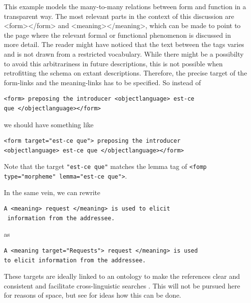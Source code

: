 \documentclass[a4paper,12pt]{article}
\begin{document}
This example models the many-to-many relations between form and function in a transparent way. The most relevant parts in the context of this discussion are <form></form> and <meaning></meaning>, which can be made to point to the page where the relevant formal or functional phenomenon is discussed in more detail. The reader might have noticed that the text between the tags varies and is not drawn from a restricted vocabulary. While there might be a possibilty to avoid this arbitrariness in future descriptions, this is not possible when retrofitting the schema on extant descriptions. Therefore, the precise target of the form-links and the meaning-links has to be specified. So instead of

\ea \begin{verbatim}<form> preposing the introducer <objectlanguage> est-ce
que </objectlanguage></form>\end{verbatim} \z

we should have something like

\ea \begin{verbatim}<form target="est-ce que"> preposing the introducer
<objectlanguage> est-ce que </objectlanguage></form>\end{verbatim} \z

Note that the target {\tt "est-ce que"} matches the lemma tag of \texttt{<fomp type="morpheme" lemma="est-ce que">}.

In the same vein, we can rewrite 

\ea \begin{verbatim}A <meaning> request </meaning> is used to elicit
 information from the addressee.\end{verbatim}\z

as
  
\ea \begin{verbatim}A <meaning target="Requests"> request </meaning> is used
to elicit information from the addressee.\end{verbatim}\z

These targets are ideally linked to an ontology to make the references clear and consistent and facilitate cross-linguistic searches \citep{FarrarEtAl2003}. This will not be pursued here for reasons of space, but see \citet{Good2004} for ideas how this can be done.
\end{document}
